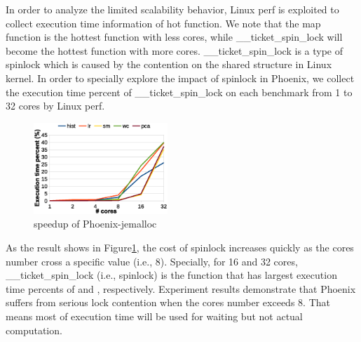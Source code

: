 In order to analyze the limited scalability behavior, Linux perf is exploited to collect execution time information of hot function. 
We note that the map function is the hottest function with less cores, while \_\_ticket\_spin\_lock will become the hottest function with more cores.
\_\_ticket\_spin\_lock is a type of spinlock which is caused by the contention on the shared structure in Linux kernel.
In order to specially explore the impact of spinlock in Phoenix, we collect the execution time percent of \_\_ticket\_spin\_lock on each benchmark from 1 to 32 cores by Linux perf.

\begin{figure}[!h!t]  
	\centering
	\includegraphics[width=0.45\textwidth]{eps/phoenix_spinlock_jemalloc.eps}
	\caption{speedup of Phoenix-jemalloc}
	\label{fig:phoenix:spinlock:jemalloc}
\end{figure}

As the result shows in Figure\ref{fig:phoenix:spinlock:jemalloc}, the cost of spinlock increases quickly as the cores number cross a specific value (i.e., 8).
Specially, for  16 and 32 cores, \_\_ticket\_spin\_lock (i.e., spinlock) is the function that has largest execution time percents of  and , respectively. 
Experiment results demonstrate that Phoenix suffers from serious lock contention when the cores number exceeds 8. 
That means most of execution time will be used for waiting but not actual computation.





